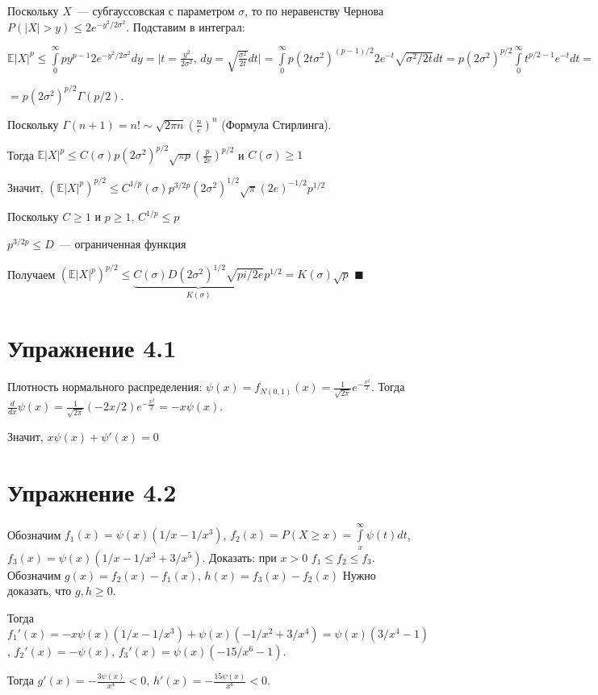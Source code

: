 \documentclass[a4paper]{article}
\begin{document}
Поскольку $X$~--- субгауссовская с параметром $\sigma$, то по неравенству Чернова $P(|X|>y)\leqslant 2e^{-y^2/2\sigma^2}$. Подставим в интеграл:

$\mathbb{E}|X|^p\leqslant \int\limits_0^\infty py^{p-1}2e^{-y^2/2\sigma^2}dy=\big|t=\frac{y^2}{2\sigma^2},\,dy=\sqrt{\frac{\sigma^2}{2t}}dt\big|=\int\limits_0^\infty p(2t\sigma^2)^{(p-1)/2}2e^{-t}\sqrt{\sigma^2/2t}dt=p(2\sigma^2)^{p/2}\int\limits_0^\infty t^{p/2-1}e^{-t}dt=$

$=p(2\sigma^2)^{p/2}\Gamma(p/2)$.

Поскольку $\Gamma(n+1)=n!\sim \sqrt{2\pi n}(\frac{n}{e})^n$ (Формула Стирлинга).

Тогда $\mathbb{E}|X|^p\leqslant C(\sigma)p(2\sigma^2)^{p/2}\sqrt{\pi p}(\frac{p}{2e})^{p/2}$ и $C(\sigma)\geqslant 1$

Значит, $(\mathbb{E}|X|^p)^{p/2}\leqslant C^{1/p}(\sigma)p^{3/2p}(2\sigma^2)^{1/2}\sqrt{\pi}(2e)^{-1/2}p^{1/2}$

Поскольку $C\geqslant 1$ и $p\geqslant 1$, $C^{1/p}\leqslant p$

$p^{3/2p}\leqslant D$~--- ограниченная функция

Получаем $(\mathbb{E}|X|^p)^{p/2}\leqslant \underbrace{C(\sigma)D(2\sigma^2)^{1/2}\sqrt{pi/2e}}_{K(\sigma)}p^{1/2}=K(\sigma)\sqrt{p}$ $\blacksquare$

\section*{Упражнение 4.1}
Плотность нормального распределения: $\psi(x)=f_{N(0,1)}(x)=\frac{1}{\sqrt{2\pi}}e^{-\frac{x^2}{2}}$. Тогда $\frac{d}{dx}\psi(x)=\frac{1}{\sqrt{2\pi}}(-2x/2)e^{-\frac{x^2}{2}}=-x\psi(x)$.

Значит, $\boxed{x\psi(x)+\psi'(x)=0}$
\section*{Упражнение 4.2}
Обозначим $f_1(x)=\psi(x)(1/x-1/x^3)$, $f_2(x)=P(X\geqslant x)=\int\limits_x^\infty\psi(t)dt$, $f_3(x)=\psi(x)(1/x-1/x^3+3/x^5)$. Доказать: при $x>0$ $f_1\leqslant f_2\leqslant f_3$. Обозначим $g(x)=f_2(x)-f_1(x)$, $h(x)=f_3(x)-f_2(x)$ Нужно доказать, что $g,h\geqslant 0$.

Тогда $f_1'(x)=-x\psi(x)(1/x-1/x^3)+\psi(x)(-1/x^2+3/x^4)=\psi(x)(3/x^4-1)$, $f_2'(x)=-\psi(x)$, $f_3'(x)=\psi(x)(-15/x^6-1)$.

Тогда $g'(x)=-\frac{3\psi(x)}{x^4}<0$, $h'(x)=-\frac{15\psi(x)}{x^6}<0$.
\end{document}
